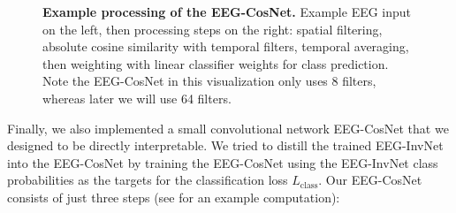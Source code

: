 \begin{figure}[htb]
    \captionsetup[subfigure]{labelformat=empty}
    \myfloatalign
     \quad
    \caption[Example processing of the EEG-CosNet.]{
    \textbf{Example processing of the EEG-CosNet.} Example EEG input on the
left, then processing steps on the right: spatial filtering, absolute
cosine similarity with temporal filters, temporal averaging, then
weighting with linear classifier weights for class prediction. Note the
EEG-CosNet in this visualization only uses 8 filters, whereas later we
will use 64 filters.
}\label{cos-net-example-fig}
\end{figure}


    Finally, we also implemented a small convolutional network EEG-CosNet
that we designed to be directly interpretable. We tried to distill the
trained EEG-InvNet into the EEG-CosNet by training the EEG-CosNet using
the EEG-InvNet class probabilities as the targets for the classification
loss $L_\textrm{class}$. Our EEG-CosNet consists of just three steps
(see  for an example computation):


